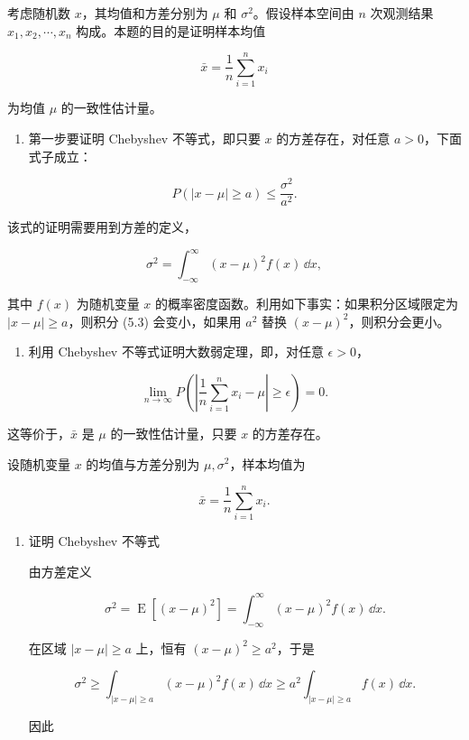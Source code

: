 ﻿


\begin{question}
考虑随机数 \(x\)，其均值和方差分别为 \(\mu\) 和
\(\sigma^2\)。假设样本空间由 \(n\) 次观测结果 \(x_1,x_2,\cdots,x_n\)
构成。本题的目的是证明样本均值

\[
\bar x=\frac1n\sum_{i=1}^{n}x_i
\]

为均值 \(\mu\) 的一致性估计量。

\begin{enumerate}
\item
  第一步要证明 Chebyshev 不等式，即只要 \(x\) 的方差存在，对任意
  \(a>0\)，下面式子成立：
\end{enumerate}

\[
P(|x-\mu|\ge a)\le \frac{\sigma^2}{a^2}.
\]

该式的证明需要用到方差的定义，

\[
\sigma^2=\int_{-\infty}^{\infty}(x-\mu)^2f(x)\,\dd{x},
\]

其中 \(f(x)\) 为随机变量 \(x\)
的概率密度函数。利用如下事实：如果积分区域限定为
\(|x-\mu|\ge a\)，则积分 (5.3) 会变小，如果用 \(a^2\) 替换
\((x-\mu)^2\)，则积分会更小。

\begin{enumerate}[start=2]
\item
  利用 Chebyshev 不等式证明大数弱定理，即，对任意 \(\epsilon>0\)，
\end{enumerate}

\[
\lim_{n\to\infty}P\left(\left|\frac1n\sum_{i=1}^{n}x_i-\mu\right|\ge\epsilon\right)=0.
\]

这等价于，\(\bar x\) 是 \(\mu\) 的一致性估计量，只要 \(x\) 的方差存在。
\begin{solution}
设随机变量 \(x\) 的均值与方差分别为 \(\mu,\sigma^2\)，样本均值为

\[
\bar x=\frac1n\sum_{i=1}^n x_i.
\]

\begin{enumerate}
\item 证明 Chebyshev 不等式

由方差定义

\[
\sigma^2=\operatorname{E}[(x-\mu)^2]=\int_{-\infty}^{\infty}(x-\mu)^2 f(x)\,\dd{x}.
\]

在区域 \(|x-\mu|\ge a\) 上，恒有 \((x-\mu)^2\ge a^2\)，于是

\[
\sigma^2 \ge \int_{|x-\mu|\ge a}(x-\mu)^2f(x)\,\dd{x}
\ge a^2\int_{|x-\mu|\ge a}f(x)\,\dd{x}.
\]

因此


\end{enumerate}
\end{solution}
\end{question}
